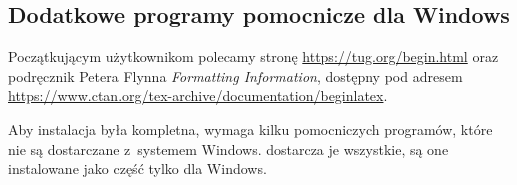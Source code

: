 \documentclass{article}
\let\textsl\textit
\begin{document}
\subsection{Dodatkowe programy pomocnicze dla Windows}

Początkującym użytkownikom polecamy stronę
\url{https://tug.org/begin.html} oraz podręcznik
Petera Flynna \textsl{Formatting Information}, dostępny pod adresem
\url{https://www.ctan.org/tex-archive/documentation/beginlatex}.

Aby instalacja była kompletna, \TL{} wymaga kilku pomocniczych
programów, które nie są dostarczane z~systemem Windows.
\TL{} dostarcza je  wszystkie,  są one instalowane jako część \TL{} tylko dla Windows.


\end{document}
